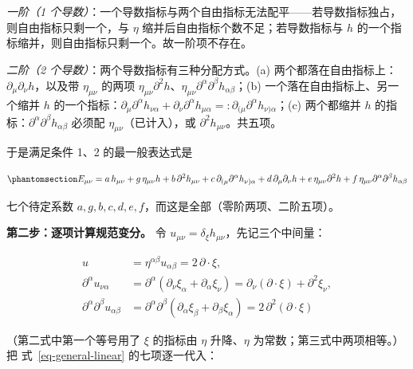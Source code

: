 \documentclass[
  chinese,
  a4paper,
  UTF8,
  12pt,
  oneside,
  openany]{ctexbook}
\theoremstyle{plain}
\theoremstyle{plain}
\theoremstyle{plain}
\theoremstyle{definition}
\theoremstyle{plain}
\theoremstyle{plain}
\theoremstyle{remark}
\begin{document}
\emph{一阶（1
个导数）}：一个导数指标与两个自由指标无法配平------若导数指标独占，则自由指标只剩一个，与
\(\eta\) 缩并后自由指标个数不足；若导数指标与 \(h\)
的一个指标缩并，则自由指标只剩一个。故一阶项不存在。

\emph{二阶（2 个导数）}：两个导数指标有三种分配方式。(a)
两个都落在自由指标上：\(\partial_{\mu}\partial_{\nu}h\)，以及带
\(\eta_{\mu\nu}\) 的两项
\(\eta_{\mu\nu}\partial^{2}h\)、\(\eta_{\mu\nu}\partial^{\alpha}\partial^{\beta}h_{\alpha\beta}\)；(b)
一个落在自由指标上、另一个缩并 \(h\)
的一个指标：\(\partial_{\mu}\partial^{\alpha}h_{\nu\alpha}+\partial_{\nu}\partial^{\alpha}h_{\mu\alpha}=:\partial_{(\mu}\partial^{\alpha}h_{\nu)\alpha}\)；(c)
两个都缩并 \(h\)
的指标：\(\partial^{\alpha}\partial^{\beta}h_{\alpha\beta}\) 必须配
\(\eta_{\mu\nu}\)（已计入），或 \(\partial^{2}h_{\mu\nu}\)。共五项。

于是满足条件 1、2 的最一般表达式是

\begin{equation}\protect\phantomsection\label{eq-general-linear}{
E_{\mu\nu}
= a\,h_{\mu\nu}
+g\,\eta_{\mu\nu}h
+b\,\partial^{2} h_{\mu\nu}
+c\,\partial_{(\mu}\partial^{\alpha}h_{\nu)\alpha}
+d\,\partial_{\mu}\partial_{\nu}h
+e\,\eta_{\mu\nu}\partial^{2} h
+f\,\eta_{\mu\nu}\partial^{\alpha}\partial^{\beta}h_{\alpha\beta}
}\end{equation}

七个待定系数 \(a,g,b,c,d,e,f\)，而这是全部（零阶两项、二阶五项）。

\textbf{第二步：逐项计算规范变分。} 令
\(u_{\mu\nu}=\delta_{\xi}h_{\mu\nu}\)，先记三个中间量：

\[
\begin{aligned}
u&=\eta^{\alpha\beta}u_{\alpha\beta}=2\,\partial\cdot\xi,\\
\partial^{\alpha}u_{\nu\alpha}&=\partial^{\alpha}\left(\partial_{\nu}\xi_{\alpha}+\partial_{\alpha}\xi_{\nu}\right)=\partial_{\nu}(\partial\cdot\xi)+\partial^{2}\xi_{\nu},\\
\partial^{\alpha}\partial^{\beta}u_{\alpha\beta}
&=\partial^{\alpha}\partial^{\beta}\left(\partial_{\alpha}\xi_{\beta}+\partial_{\beta}\xi_{\alpha}\right)
=2\,\partial^{2}(\partial\cdot\xi)
\end{aligned}
\]

（第二式中第一个等号用了 \(\xi\) 的指标由 \(\eta\) 升降、\(\eta\)
为常数；第三式中两项相等。）把 式~\ref{eq-general-linear}
的七项逐一代入：
\end{document}
